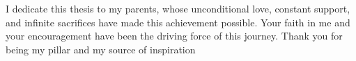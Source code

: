 
%

\begin{ntdedicatory}

I dedicate this thesis to my parents, whose unconditional love, constant support, and infinite sacrifices have made this achievement possible. Your faith in me and your encouragement have been the driving force of this journey. Thank you for being my pillar and my source of inspiration

\end{ntdedicatory}
